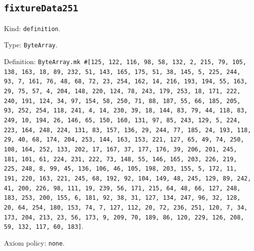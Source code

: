 \documentclass[11pt]{article}
\begin{document}
\subsection*{\texttt{fixtureData251}}
\noindent Kind: \texttt{definition}.\par
\noindent Type: \texttt{ByteArray}.\par
\noindent Definition: \texttt{ByteArray.mk \#[125, 122, 116, 98, 58, 132, 2, 215, 79, 105, 138, 163, 18, 89, 232, 51, 143, 165, 175, 51, 38, 145, 5, 225, 244, 93, 7, 161, 76, 48, 68, 72, 23, 254, 162, 14, 216, 193, 194, 55, 163, 29, 75, 57, 4, 204, 148, 220, 124, 78, 243, 179, 253, 18, 171, 222, 240, 191, 124, 34, 97, 154, 58, 250, 71, 88, 187, 55, 66, 185, 205, 93, 252, 254, 118, 241, 4, 14, 230, 39, 18, 144, 83, 79, 44, 118, 83, 249, 10, 194, 26, 146, 65, 150, 160, 131, 97, 85, 243, 129, 5, 224, 223, 164, 248, 224, 131, 83, 157, 136, 29, 244, 77, 185, 24, 193, 118, 29, 40, 68, 174, 204, 253, 144, 163, 153, 221, 127, 65, 49, 74, 250, 108, 164, 252, 133, 202, 17, 167, 37, 177, 176, 39, 206, 201, 245, 181, 101, 61, 224, 231, 222, 73, 148, 55, 146, 165, 203, 226, 219, 225, 248, 8, 99, 45, 136, 106, 46, 105, 198, 203, 155, 5, 172, 11, 191, 220, 163, 221, 245, 68, 192, 92, 104, 149, 48, 245, 129, 89, 242, 41, 200, 226, 98, 111, 19, 239, 56, 171, 215, 64, 48, 66, 127, 248, 183, 253, 200, 155, 6, 181, 92, 38, 31, 127, 134, 247, 96, 32, 128, 20, 64, 254, 180, 153, 74, 7, 127, 112, 20, 72, 236, 251, 120, 7, 34, 173, 204, 213, 23, 56, 173, 9, 209, 70, 189, 86, 120, 229, 126, 208, 59, 132, 117, 60, 183]}.\par
\noindent Axiom policy: \texttt{none}.\par
\end{document}
